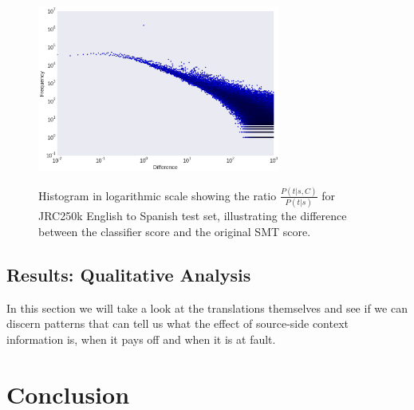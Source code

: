 \documentclass[smallextended]{svjour3}       %
\theoremstyle{break}
\begin{document}
\begin{figure}
\includegraphics[width=80.00mm]{scoredifference.png}
\label{fig:scoredifference}
\caption{Histogram in logarithmic scale showing the ratio $\frac{P(t|s,C)}{P(t|s)}$ for JRC250k English to Spanish test set, illustrating the difference between the classifier score and the original SMT score.}

\end{figure}



\subsection{Results: Qualitative Analysis}

In this section we will take a look at the translations themselves and see if
we can discern patterns that can tell us what the effect of source-side context
information is, when it pays off and when it is at fault.


\section{Conclusion} 





\end{document}
